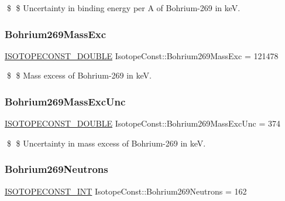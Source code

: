 \$ \$ Uncertainty in binding energy per A of Bohrium-\/269 in keV. \mbox{\label{group___isotope_const-_bohrium-_bh269_gafaaddeae53b7618cd35c43cfd8cd35b8}} 
\subsubsection{\texorpdfstring{Bohrium269\+Mass\+Exc}{Bohrium269MassExc}}
{\footnotesize\ttfamily \mbox{\hyperlink{group___isotope_const-_macros_ga8f45a7272ce02c0b4c65c44636ed719a}{I\+S\+O\+T\+O\+P\+E\+C\+O\+N\+S\+T\+\_\+\+D\+O\+U\+B\+LE}} Isotope\+Const\+::\+Bohrium269\+Mass\+Exc = 121478}

\$ \$ Mass excess of Bohrium-\/269 in keV. \mbox{\label{group___isotope_const-_bohrium-_bh269_gad9aead8be3d458910974cdb4e87e9f2b}} 
\subsubsection{\texorpdfstring{Bohrium269\+Mass\+Exc\+Unc}{Bohrium269MassExcUnc}}
{\footnotesize\ttfamily \mbox{\hyperlink{group___isotope_const-_macros_ga8f45a7272ce02c0b4c65c44636ed719a}{I\+S\+O\+T\+O\+P\+E\+C\+O\+N\+S\+T\+\_\+\+D\+O\+U\+B\+LE}} Isotope\+Const\+::\+Bohrium269\+Mass\+Exc\+Unc = 374}

\$ \$ Uncertainty in mass excess of Bohrium-\/269 in keV. \mbox{\label{group___isotope_const-_bohrium-_bh269_ga666e989583d4fa709b67b014e99767fc}} 
\subsubsection{\texorpdfstring{Bohrium269\+Neutrons}{Bohrium269Neutrons}}
{\footnotesize\ttfamily \mbox{\hyperlink{group___isotope_const-_macros_ga5f18360b3e99483a35c32d789e62621c}{I\+S\+O\+T\+O\+P\+E\+C\+O\+N\+S\+T\+\_\+\+I\+NT}} Isotope\+Const\+::\+Bohrium269\+Neutrons = 162}

